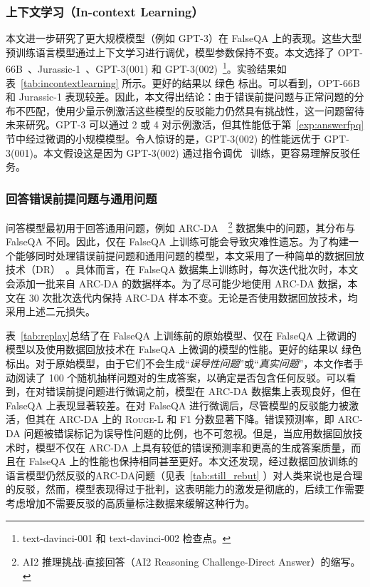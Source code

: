 \subsubsection{上下文学习（In-context Learning）}
本文进一步研究了更大规模模型（例如 GPT-3）在 FalseQA 上的表现。这些大型预训练语言模型通过上下文学习进行调优，模型参数保持不变。本文选择了 {OPT-66B}~\cite{zhang2022opt}、Jurassic-1~\cite{lieber2021jurassic}、GPT-3(001) 和 GPT-3(002)~\footnote{text-davinci-001 和 text-davinci-002 检查点。}。实验结果如表~\ref{tab:incontextlearning} 所示。更好的结果以 \colorbox{emphcolor}{绿色} 标出。可以看到，OPT-66B 和 Jurassic-1 表现较差。因此，本文得出结论：由于错误前提问题与正常问题的分布不匹配，使用少量示例激活这些模型的反驳能力仍然具有挑战性，这一问题留待未来研究。GPT-3 可以通过 2 或 4 对示例激活，但其性能低于第~\ref{exp:answerfpq} 节中经过微调的小规模模型。令人惊讶的是，GPT-3(002) 的性能远优于 GPT-3(001)。本文假设这是因为 GPT-3(002) 通过指令调优~\cite{ouyang2022training} 训练，更容易理解反驳任务。


\subsubsection{回答错误前提问题与通用问题}
问答模型最初用于回答通用问题，例如 ARC-DA~\cite{bhakthavatsalam2021think}~\footnote{AI2 推理挑战-直接回答（AI2 Reasoning Challenge-Direct Answer）的缩写。} 数据集中的问题，其分布与 FalseQA 不同。因此，仅在 FalseQA 上训练可能会导致灾难性遗忘。为了构建一个能够同时处理错误前提问题和通用问题的模型，本文采用了一种简单的数据回放技术（DR）~\cite{chaudhry2019tiny}。具体而言，在 FalseQA 数据集上训练时，每次迭代批次时，本文会添加一批来自 ARC-DA 的数据样本。为了尽可能少地使用 ARC-DA 数据，本文在 30 次批次迭代内保持 ARC-DA 样本不变。无论是否使用数据回放技术，均采用上述二元损失。

表~\ref{tab:replay}总结了在 FalseQA 上训练前的原始模型、仅在 FalseQA 上微调的模型以及使用数据回放技术在 FalseQA 上微调的模型的性能。更好的结果以 \colorbox{emphcolor}{绿色} 标出。对于原始模型，由于它们不会生成“\textit{误导性问题}”或“\textit{真实问题}”，本文作者手动阅读了 100 个随机抽样问题对的生成答案，以确定是否包含任何反驳。可以看到，在对错误前提问题进行微调之前，模型在 ARC-DA 数据集上表现良好，但在 FalseQA 上表现显著较差。在对 FalseQA 进行微调后，尽管模型的反驳能力被激活，但其在 ARC-DA 上的 \textsc{Rouge}-L 和 F1 分数显著下降。错误预测率，即 ARC-DA 问题被错误标记为误导性问题的比例，也不可忽视。但是，当应用数据回放技术时，模型不仅在 ARC-DA 上具有较低的错误预测率和更高的生成答案质量，而且在 FalseQA 上的性能也保持相同甚至更好。本文还发现，经过数据回放训练的语言模型仍然反驳的ARC-DA问题（见表~\ref{tab:still_rebut} ）对人类来说也是合理的反驳，然而，模型表现得过于批判，这表明能力的激发是彻底的，后续工作需要考虑增加不需要反驳的高质量标注数据来缓解这种行为。

